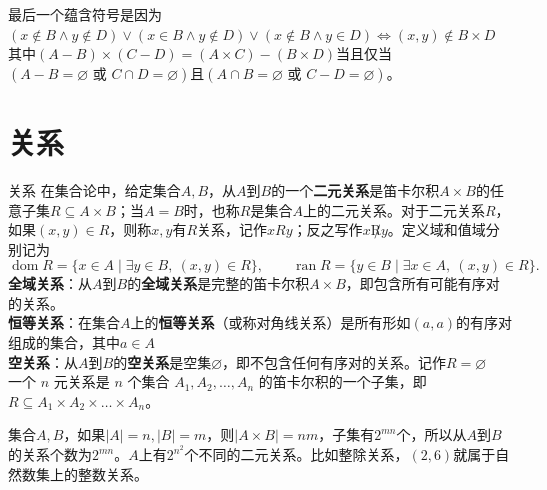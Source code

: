 最后一个蕴含符号是因为$(x \notin B \land y \notin D)\lor(x \in B \land y \notin D)\lor(x \notin B \land y \in D)\Leftrightarrow (x,y) \notin B \times D$\\
其中$(A-B)\times(C-D)=(A\times C)-(B\times D)$当且仅当$(A-B=\varnothing\text{ 或 }C\cap D=\varnothing)$且$(A\cap B=\varnothing\text{ 或 }C-D=\varnothing)$。
\section{关系}
\begin{definition}{关系}{}
在集合论中，给定集合$A,B$，从$A$到$B$的一个\textbf{二元关系}是笛卡尔积$A\times B$的任意子集$R\subseteq A\times B$；当$A=B$时，也称$R$是集合$A$上的二元关系。对于二元关系$R$，如果$(x,y)\in R$，则称$x,y$有$R$关系，记作$xRy$；反之写作$x\not Ry$。定义域和值域分别记为
\[
\operatorname{dom} R=\{x\in A\mid \exists y\in B,\ (x,y)\in R\},\qquad
\operatorname{ran} R=\{y\in B\mid \exists x\in A,\ (x,y)\in R\}.
\]
\textbf{全域关系}：从$A$到$B$的\textbf{全域关系}是完整的笛卡尔积$A \times B$，即包含所有可能有序对的关系。\\
\textbf{恒等关系}：在集合$A$上的\textbf{恒等关系}（或称对角线关系）是所有形如$(a,a)$的有序对组成的集合，其中$a \in A$\\
\textbf{空关系}：从$A$到$B$的\textbf{空关系}是空集$\varnothing$，即不包含任何有序对的关系。记作$R = \varnothing$\\
一个 $n$ 元关系是 $n$ 个集合 $A_1, A_2, \dots, A_n$ 的笛卡尔积的一个子集，即 $R \subseteq A_1 \times A_2 \times \dots \times A_n$。
\end{definition}
集合$A,B$，如果$|A|=n,|B|=m$，则$|A\times B|=nm$，子集有$2^{mn}$个，所以从$A$到$B$的关系个数为$2^{mn}$。$A$上有$2^{n^2}$个不同的二元关系。比如整除关系，$(2,6)$就属于自然数集上的整数关系。

